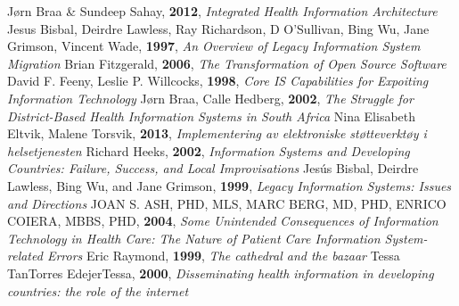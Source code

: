 \begin{thebibliography}{99}
 J\o rn Braa \& Sundeep Sahay, {\bfseries 2012}, {\itshape Integrated Health Information Architecture}
 Jesus Bisbal, Deirdre Lawless, Ray Richardson, D O’Sullivan, Bing Wu, Jane Grimson, Vincent Wade, {\bfseries 1997}, {\itshape An Overview of Legacy Information System Migration}
 Brian Fitzgerald, {\bfseries 2006}, {\itshape The Transformation of Open Source Software}
 David F. Feeny, Leslie P. Willcocks, {\bfseries 1998}, {\itshape Core IS Capabilities for Expoiting Information Technology}
 J\o rn Braa, Calle Hedberg, {\bfseries  2002}, {\itshape The Struggle for District-Based Health Information Systems in South Africa}
 Nina Elisabeth Eltvik, Malene Torsvik, {\bfseries 2013}, {\itshape Implementering av elektroniske st\o tteverktøy i helsetjenesten}
 Richard Heeks, {\bfseries 2002}, {\itshape Information Systems and Developing Countries: Failure, Success, and Local Improvisations}
 Jesús Bisbal, Deirdre Lawless, Bing Wu, and Jane Grimson, {\bfseries 1999}, {\itshape Legacy Information Systems: Issues and Directions}
 JOAN S. ASH, PHD, MLS, MARC BERG, MD, PHD, ENRICO COIERA, MBBS, PHD, {\bfseries 2004}, {\itshape Some Unintended Consequences of Information Technology in Health Care: The Nature of Patient Care Information System-related Errors}
 Eric Raymond, {\bfseries 1999}, {\itshape The cathedral and the bazaar}
 Tessa TanTorres EdejerTessa, {\bfseries 2000}, {\itshape Disseminating health information in developing countries: the role of the internet}
\end{thebibliography}